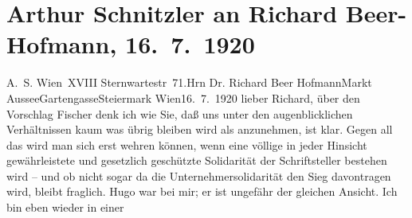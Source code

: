 

               \section[Arthur Schnitzler an Richard Beer-Hofmann, 16. 7. 1920]{ Arthur Schnitzler an Richard Beer-Hofmann, 16. 7. 1920}\nopagebreak{}\rehead{ }\begin{ledgroupsized}[t]{13cm}\normalsize\beginnumbering{} \toendnotes[C]{\smallbreak\pagebreak[2]} 
\toendnotes[C]{\smallbreak}\pstart{}{\pb}A. S. Wien XVIII
                     Sternwartestr 71.\pend{}{\bigskip}\pstart{}{\pb}Hrn Dr. Richard Beer Hofmann\pend{}\pstart{}Markt Aussee\pend{}\pstart{}Gartengasse\pend{}\pstart{}Steiermark\pend{}{\bigskip}\pstart
           \raggedleft{}{\pb}Wien16. 7. 1920\pend
           \pstart{}lieber Richard,\pend\pstart
           über den Vorschlag Fischer denk ich wie Sie, daß
               uns unter den augenblicklichen Verhältnissen kaum was übrig bleiben wird als
               anzunehmen, ist klar. Gegen all das wird man sich erst wehren können, wenn eine
               völlige in jeder Hinsicht gewährleistete und gesetzlich geschützte Solidarität der
               Schriftsteller bestehen wird – und ob nicht sogar da{\geminationn}
               die Unternehmersolidarität den Sieg davontragen wird, bleibt fraglich. Hugo war \label{KLL02350_Beer-Hofmann-1v}\label{KLL02350_Beer-Hofmann-1h} bei mir; er ist ungefähr der gleichen Ansicht. Ich bin eben wieder in einer

\end{ledgroupsized}
